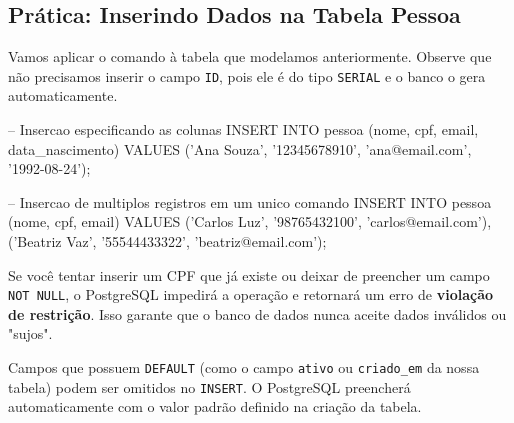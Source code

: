 \documentclass[12pt,a4paper,openright]{book}
\begin{document}
\subsection{Prática: Inserindo Dados na Tabela Pessoa}

Vamos aplicar o comando à tabela que modelamos anteriormente. Observe que não precisamos inserir o campo \texttt{ID}, pois ele é do tipo \texttt{SERIAL} e o banco o gera automaticamente.

\begin{sqlcode}
-- Insercao especificando as colunas
INSERT INTO pessoa (nome, cpf, email, data_nascimento)
VALUES ('Ana Souza', '12345678910', 'ana@email.com', '1992-08-24');

-- Insercao de multiplos registros em um unico comando
INSERT INTO pessoa (nome, cpf, email)
VALUES 
    ('Carlos Luz', '98765432100', 'carlos@email.com'),
    ('Beatriz Vaz', '55544433322', 'beatriz@email.com');
\end{sqlcode}



\begin{tcolorbox}[colback=red!5,colframe=red!40!black,title=Atenção: Erros de Restrição]
Se você tentar inserir um CPF que já existe ou deixar de preencher um campo \texttt{NOT NULL}, o PostgreSQL impedirá a operação e retornará um erro de \textbf{violação de restrição}. Isso garante que o banco de dados nunca aceite dados inválidos ou "sujos".
\end{tcolorbox}

\begin{tcolorbox}[colback=blue!5,colframe=blue!40!black,title=Dica do Professor: Omissions]
Campos que possuem \texttt{DEFAULT} (como o campo \texttt{ativo} ou \texttt{criado\_em} da nossa tabela) podem ser omitidos no \texttt{INSERT}. O PostgreSQL preencherá automaticamente com o valor padrão definido na criação da tabela.
\end{tcolorbox}

\vspace{0.5cm}
\begin{center}

\end{center}




\end{document}
